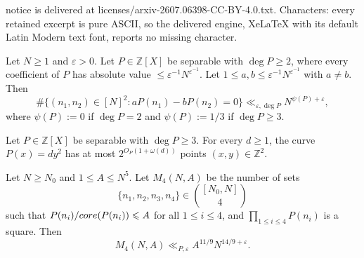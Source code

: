 \documentclass[10pt,a4paper]{amsart}
\newcommand{\co}{\textnormal{core}}
\renewcommand{\ge}{\geqslant}
\renewcommand{\le}{\leqslant}
\begin{document}
notice is delivered at licenses/arxiv-2607.06398-CC-BY-4.0.txt. Characters: every retained excerpt is pure ASCII, so the delivered engine, XeLaTeX with its default Latin Modern text font, reports no missing character.
\begin{lemma}
\label{CS2.5}
Let $N\ge 1$ and $\varepsilon > 0$.
Let $P\in \mathbb{Z}[X]$ be separable with $\deg{P} \ge 2$,
where every coefficient of $P$ has absolute value
$\le \varepsilon^{-1} N^{\varepsilon^{-1}}$.
Let $1\le a,b \le \varepsilon^{-1} N^{\varepsilon^{-1}}$ with $a\ne b$.
Then
\[
\#\{(n_1,n_2)\in [N]^2: aP(n_1) - bP(n_2) = 0\}
  \ll_{\varepsilon,\deg{P}} N^{\psi(P)+\varepsilon},
\]
where $\psi(P) := 0$ if $\deg{P}=2$ and $\psi(P) := 1/3$ if $\deg{P}\ge 3$.
\end{lemma}

\begin{lemma}
\label{siegel}
Let $P\in \mathbb{Z}[X]$ be separable with $\deg{P} \ge 3$.
For every $d\ge 1$,
the curve $P(x) = dy^2$ has at most $2^{O_P(1+\omega(d))}$
points $(x,y)\in \mathbb{Z}^2$.
\end{lemma}

\begin{proposition}
\label{unconditional-Rademacher-off-diagonal}
Let $N\ge N_0$ and $1\le A\le N^5$.
Let $M_4(N,A)$ be the number of sets
$$\{n_1,n_2,n_3,n_4\}\in \binom{[N_0,N]}{4}$$
such that $P(n_i)/\co(P(n_i)) \le A$ for all $1\le i\le 4$,
and $\prod_{1\le i\le 4} P(n_i)$ is a square.
Then
$$M_4(N,A) \ll_{P,\varepsilon} A^{11/9} N^{14/9+\varepsilon}.$$
\end{proposition}
\end{document}
